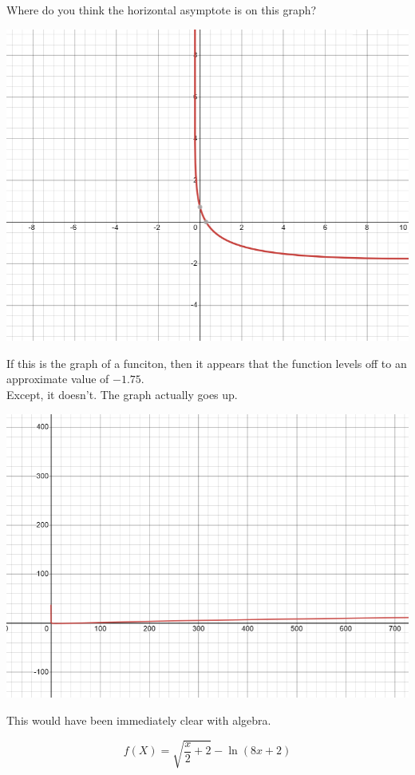 \documentclass{ximera}
\begin{document}
\begin{example}


Where do you think the horizontal asymptote is on this graph?

\begin{image}
\includegraphics{pics/graph_1A.png}
\end{image}

If this is the graph of a funciton, then it appears that the function levels off to an approximate value of $-1.75$. \\


Except, it doesn't. The graph actually goes up.

\begin{image}
\includegraphics{pics/graph_1B.png}
\end{image}

This would have been immediately clear with algebra.

\[  f(X) = \sqrt{\frac{x}{2}+2} - \ln(8x+2)      \]


\end{example}
\end{document}
